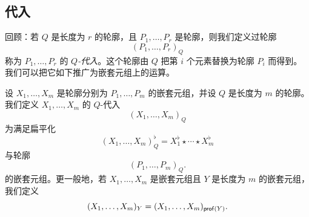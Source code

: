 


\subsection{代入}

回顾：若 $Q$ 是长度为 $r$ 的轮廓，且 $P_1,\dots,P_r$ 是轮廓，则我们定义过轮廓
\[
(P_1,\dots,P_r)_Q
\]
称为 $P_1,\dots,P_r$ 的 $Q${\it-代入}。这个轮廓由 $Q$ 把第 $i$ 个元素替换为轮廓 $P_i$ 而得到。我们可以把它如下推广为嵌套元组上的运算。

\begin{definition}
    设 $X_1,\dots,X_m$ 是轮廓分别为 $P_1,\dots,P_m$ 的嵌套元组，并设 $Q$ 是长度为 $m$ 的轮廓。我们定义 $X_1,\dots,X_m$ 的 $Q$-代入
    \[
    (X_1,\dots,X_m)_Q
    \]
    为满足扁平化
    \[
    (X_1,\dots,X_m)_Q^\flat = X_1^\flat \star \cdots \star X_m^\flat
    \]
    与轮廓
    \[
    (P_1,\dots,P_m)_Q. 
    \]
    的嵌套元组。更一般地，若 $X_1,\dots,X_m$ 是嵌套元组且 $Y$ 是长度为 $m$ 的嵌套元组，我们定义
    \[
    (X_1,\dots,X_m)_Y = (X_1,\dots,X_m)_{\mathsf{prof}(Y)}.
    \]
\end{definition}





